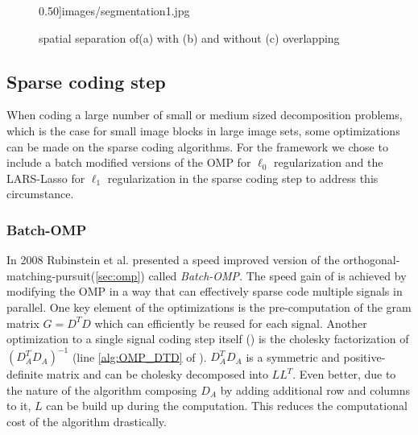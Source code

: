 \begin{figure}[h]
{0.50]{images/segmentation1.jpg}}
\hspace{5mm}
\caption[spatial separation]{spatial separation of(a) with (b) and without (c)
overlapping}
\label{fig:separation}
\end{figure}

\subsection{Sparse coding step}
When coding a large number of small or medium sized decomposition problems,
which is the case for small image blocks in large image sets, some
optimizations can be made on the sparse coding algorithms. 
For the framework we chose to include a batch modified versions of the OMP for
$\ell_0$ regularization and the LARS-Lasso for $\ell_1$ regularization in the
sparse coding step to address this circumstance. 

\subsubsection{Batch-OMP}
In 2008 Rubinstein et al.\cite{Rubinstein2008} presented a speed improved
version of the orthogonal-matching-pursuit(\ref{sec:omp}) called
\emph{Batch-OMP}. The speed gain of  is achieved
by modifying the OMP in a way that can effectively sparse code
multiple signals in parallel. One key element of the optimizations is the
pre-computation of the gram matrix $G=D^TD$ which can efficiently be reused
for each signal. Another optimization to a single signal coding step itself
() is the cholesky factorization of $\left( D_A^T D_A
\right)^{-1}$ (line \ref{alg:OMP_DTD} of ). $D_A^T
D_A$ is a symmetric and positive-definite matrix and can be cholesky decomposed
into $LL^T$. Even better, due to the nature of the algorithm composing $D_A$
by adding additional row and columns to it, $L$ can be build up during the
computation. This reduces the computational cost of the algorithm drastically.

